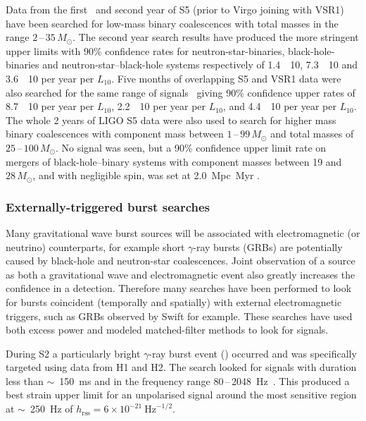 Data from the first~\cite{Abbott:2009e} and second year of S5 (prior to Virgo
joining with VSR1)~\cite{Abbott:2009f} have been searched for low-mass binary
coalescences with total masses in the range $2$\,--\,$35\,M_{\odot}$. The second
year search results have produced the more stringent upper limits with 90\%
confidence rates for neutron-star-binaries, black-hole-binaries and neutron-star--black-hole systems respectively of 1.4~\texttimes~10,
7.3~\texttimes~10 and 3.6~\texttimes~10 per year
per $L_{10}$. Five months of overlapping S5 and VSR1 data were also
searched for the same range of signals~\cite{Abadie:2010f} giving 90\%
confidence upper rates of 8.7~\texttimes~10 per year per
$L_{10}$, 2.2~\texttimes~10 per year per $L_{10}$, and
4.4~\texttimes~10 per year per $L_{10}$. The whole 2 years
of LIGO S5 data were also used to search for higher mass binary
coalescences with component mass between $1$\,--\,$99\,M_{\odot}$
and total masses of $25$\,--\,$100\,M_{\odot}$. No signal was
seen, but a 90\% confidence upper limit rate on mergers of black-hole--binary systems with component masses between 19 and
$28\,M_{\odot}$, and with negligible spin, was set at
2.0~Mpc~Myr \cite{Abadie:2011a}.


\subsubsection{Externally-triggered burst searches}


Many gravitational wave burst sources will be associated with electromagnetic
(or neutrino) counterparts, for example short $\gamma$-ray bursts (GRBs) are
potentially caused by black-hole and neutron-star coalescences. Joint
observation of a source as both a gravitational wave and electromagnetic
event also greatly increases the confidence in a detection. Therefore many
searches have been performed to look for bursts coincident (temporally and
spatially) with external electromagnetic triggers, such as GRBs observed by
Swift for example. These searches have used both excess power and modeled
matched-filter methods to look for signals.


During S2 a particularly bright $\gamma$-ray burst event () occurred
and was specifically targeted using data from H1 and H2. The search looked for
signals with duration less than $\sim$~150~ms and in the frequency range
80\,--\,2048~Hz~\cite{Abbott:2005d}. This produced a best strain upper limit for an
unpolarised signal around the most sensitive region at  $\sim$~250~Hz
of $h_{\mathrm{rss}}=6\times10^{-21} \mathrm{\ Hz}^{-1/2}$.


